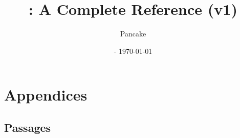 \documentclass[openany, 12pt, b5paper]{memoir}
\begin{document}
\title{\langname : A Complete Reference (v1)}
\author{Pancake}
\date{ - \today}
\frontmatter
\begin{titlingpage}
  \maketitle
\end{titlingpage}

\begin{KeepFromToc}
  \tableofcontents
\end{KeepFromToc}
\mainmatter






\part{Appendices}
\appendix

\chapter{Passages}

\backmatter
\end{document}

